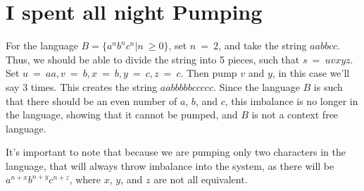 \documentclass[10pt,reqno,sumlimits]{amsart}
\theoremstyle{plain}
\theoremstyle{definition}
\newcommand{\1}{{\bf 1}}
\numberwithin{equation}{section}
\begin{document}
\section {I spent all night Pumping}
For the language $B = \{a^nb^nc^n|n\ \geq 0\}$, set $n\ =\ 2$, and take the string $aabbcc$. Thus, we should be able to divide the string into 5 pieces, such that $s\ =\ uvxyz$. Set $u\ =\ aa, v\ =\ b, x\ =\ b, y\ =\ c, z\ =\ c$. Then pump $v$ and $y$, in this case we'll say 3 times. This creates the string $aabbbbbccccc$. Since the language $B$ is such that there should be an even number of $a$, $b$, and $c$, this imbalance is no longer in the language, showing that it cannot be pumped, and $B$ is not a context free language.

It's important to note that because we are pumping only two characters in the language, that will always throw imbalance into the system, as there will be $a^{n+x}b^{n+y}c^{n+z}$, where $x$, $y$, and $z$ are not all equivalent.
\end{document}
